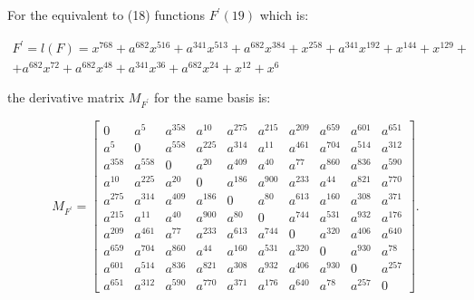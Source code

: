 \documentclass[10pt]{article}
\begin{document}
For the equivalent to (18) functions $F^{\prime}(19)$ which is:

$$
\begin{array}{r}
F^{\prime}=l(F)=x^{768}+a^{682} x^{516}+a^{341} x^{513}+a^{682} x^{384}+x^{258}+a^{341} x^{192}+x^{144}+x^{129}+ \\
+a^{682} x^{72}+a^{682} x^{48}+a^{341} x^{36}+a^{682} x^{24}+x^{12}+x^{6}
\end{array}
$$

the derivative matrix $M_{F^{\prime}}$ for the same basis is:

\[
M_{F^{\prime}}=\left[\begin{array}{cccccccccc}
0 & a^{5} & a^{358} & a^{10} & a^{275} & a^{215} & a^{209} & a^{659} & a^{601} & a^{651}  \tag{26}\\
a^{5} & 0 & a^{558} & a^{225} & a^{314} & a^{11} & a^{461} & a^{704} & a^{514} & a^{312} \\
a^{358} & a^{558} & 0 & a^{20} & a^{409} & a^{40} & a^{77} & a^{860} & a^{836} & a^{590} \\
a^{10} & a^{225} & a^{20} & 0 & a^{186} & a^{900} & a^{233} & a^{44} & a^{821} & a^{770} \\
a^{275} & a^{314} & a^{409} & a^{186} & 0 & a^{80} & a^{613} & a^{160} & a^{308} & a^{371} \\
a^{215} & a^{11} & a^{40} & a^{900} & a^{80} & 0 & a^{744} & a^{531} & a^{932} & a^{176} \\
a^{209} & a^{461} & a^{77} & a^{233} & a^{613} & a^{744} & 0 & a^{320} & a^{406} & a^{640} \\
a^{659} & a^{704} & a^{860} & a^{44} & a^{160} & a^{531} & a^{320} & 0 & a^{930} & a^{78} \\
a^{601} & a^{514} & a^{836} & a^{821} & a^{308} & a^{932} & a^{406} & a^{930} & 0 & a^{257} \\
a^{651} & a^{312} & a^{590} & a^{770} & a^{371} & a^{176} & a^{640} & a^{78} & a^{257} & 0
\end{array}\right] .
\]
\end{document}

